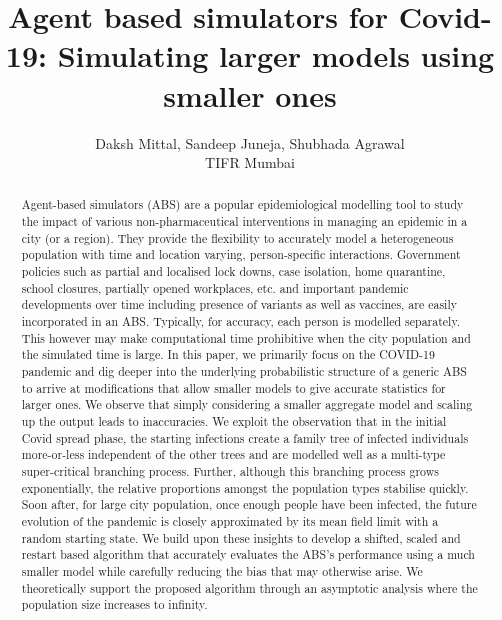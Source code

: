 \documentclass{article}
\title{Agent based simulators for Covid-19: Simulating larger models using smaller ones
}
\author{Daksh Mittal,  Sandeep Juneja,   Shubhada Agrawal  \\
\vspace{0.1in}
TIFR Mumbai}
\theoremstyle{definition}
\begin{document}
\maketitle


\begin{abstract}

Agent-based simulators (ABS) are a popular epidemiological modelling tool to study the impact of various  non-pharmaceutical interventions in managing an epidemic in a city (or a region). 
They provide the flexibility to accurately model a heterogeneous population with time and location varying, person-specific interactions. Government policies such as partial and localised lock downs, case isolation, home quarantine, school closures, partially opened workplaces, etc.  and important pandemic developments over time including presence of variants as well as vaccines, are easily incorporated in an ABS. Typically, for accuracy, each person is modelled separately. This however may make computational time prohibitive when the city population  and the simulated time is large.  In this paper, we primarily focus on the COVID-19 pandemic and dig deeper into the underlying probabilistic structure of a generic ABS to arrive at modifications that allow smaller models to give accurate statistics for larger ones. We observe that simply considering a smaller aggregate model and scaling up the output leads to inaccuracies. We exploit the observation that  in the initial Covid spread phase, the starting infections create a family tree of infected individuals more-or-less independent of the other trees and are modelled well as a multi-type super-critical branching process. Further, although this branching process grows exponentially, the relative proportions amongst the population  types stabilise  quickly. Soon after, for large city population,  once enough people have been infected, the future evolution of the pandemic is closely approximated by its mean field limit with a random starting state. We build upon these insights to develop a shifted, scaled and restart based algorithm that accurately evaluates the ABS's performance  using  a much smaller model while carefully reducing the bias that may otherwise arise. We theoretically support 
the proposed algorithm through an asymptotic analysis where the population size increases to infinity.
\end{abstract}
\end{document}
